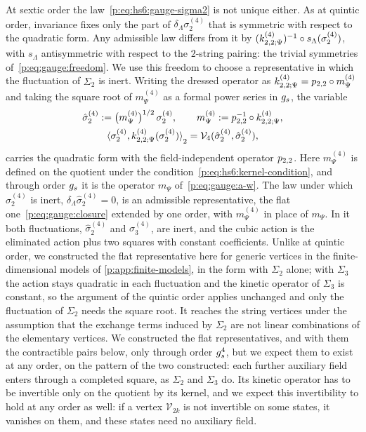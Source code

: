 At sextic order the law~\eqref{p:eq:hs6:gauge-sigma2} is not unique either.
  As at quintic order, invariance fixes only the part of $\delta_\Lambda \sigma_2^{(4)}$ that is symmetric with respect to the quadratic form.
  Any admissible law differs from it by $(\kin{2}{\Psi}{4})^{-1} \circ s_\Lambda(\sigma_2^{(4)})$, with $s_\Lambda$ antisymmetric with respect to the $2$-string pairing: the trivial symmetries of~\eqref{p:eq:gauge:freedom}.
  We use this freedom to choose a representative in which the fluctuation of $\Sigma_2$ is inert.
  Writing the dressed operator as $\kin{2}{\Psi}{4} = \sprod{2}{2} \circ m^{(4)}_\Psi$ and taking the square root of $m^{(4)}_\Psi$ as a formal power series in $g_s$, the variable
  \begin{equation}
  \label{p:eq:hs6:flat-variable}
  \begin{gathered}
    \hat\sigma_2^{(4)}
      := \big( m^{(4)}_\Psi \big)^{1/2} \, \sigma_2^{(4)},
    \qquad
    m^{(4)}_\Psi
      := \sprod{2}{2}^{-1} \circ \kin{2}{\Psi}{4},
    \\
    \pair[2]{\sigma_2^{(4)}}{\kin{2}{\Psi}{4}(\sigma_2^{(4)})}
      = \vertex{4}(\hat\sigma_2^{(4)}, \hat\sigma_2^{(4)}),
  \end{gathered}
\end{equation}
  carries the quadratic form with the field-independent operator $p_{2,2}$.
  Here $m^{(4)}_\Psi$ is defined on the quotient under the condition~\eqref{p:eq:hs6:kernel-condition}, and through order $g_s$ it is the operator $m_\Psi$ of~\eqref{p:eq:gauge:a-w}.
  The law under which $\hat\sigma_2^{(4)}$ is inert, $\delta_\Lambda \hat\sigma_2^{(4)} = 0$, is an admissible representative, the flat one~\eqref{p:eq:gauge:closure} extended by one order, with $m^{(4)}_\Psi$ in place of $m_\Psi$.
  In it both fluctuations, $\hat\sigma_2^{(4)}$ and $\sigma_3^{(4)}$, are inert, and the cubic action is the eliminated action plus two squares with constant coefficients.
  Unlike at quintic order, we constructed the flat representative here for generic vertices in the finite-dimensional models of \cref{p:app:finite-models}, in the form with $\Sigma_2$ alone; with $\Sigma_3$ the action stays quadratic in each fluctuation and the kinetic operator of $\Sigma_3$ is constant, so the argument of the quintic order applies unchanged and only the fluctuation of $\Sigma_2$ needs the square root.
  It reaches the string vertices under the assumption that the exchange terms induced by $\Sigma_2$ are not linear combinations of the elementary vertices.
  We constructed the flat representatives, and with them the contractible pairs below, only through order $g_s^4$, but we expect them to exist at any order, on the pattern of the two constructed: each further auxiliary field enters through a completed square, as $\Sigma_2$ and $\Sigma_3$ do.
  Its kinetic operator has to be invertible only on the quotient by its kernel, and we expect this invertibility to hold at any order as well: if a vertex $\mathcal V_{2k}$ is not invertible on some states, it vanishes on them, and these states need no auxiliary field.


